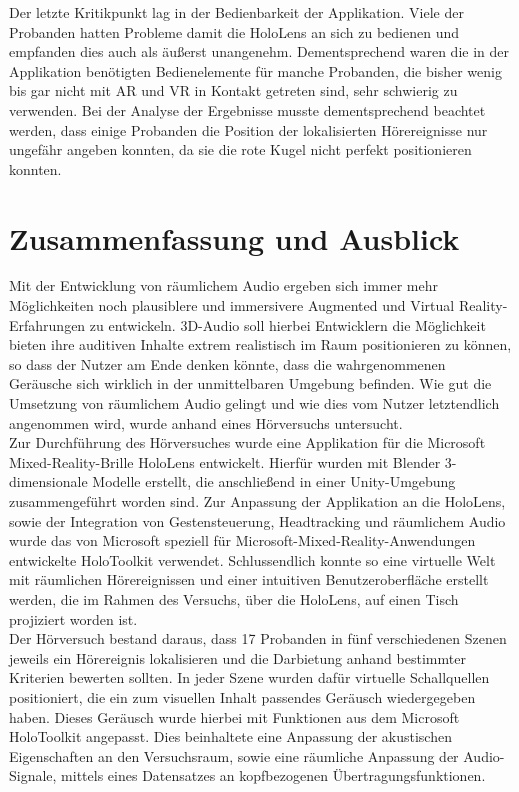 Der letzte Kritikpunkt lag in der Bedienbarkeit der Applikation. Viele der Probanden hatten Probleme damit die HoloLens an sich zu bedienen und empfanden dies auch als äußerst unangenehm. Dementsprechend waren die in der Applikation benötigten Bedienelemente für manche Probanden, die bisher wenig bis gar nicht mit AR und VR in Kontakt getreten sind, sehr schwierig zu verwenden. Bei der Analyse der Ergebnisse musste dementsprechend beachtet werden, dass einige Probanden die Position der lokalisierten Hörereignisse nur ungefähr angeben konnten, da sie die rote Kugel nicht perfekt positionieren konnten.


\chapter{Zusammenfassung und Ausblick}
Mit der Entwicklung von räumlichem Audio ergeben sich immer mehr Möglichkeiten noch plausiblere und immersivere Augmented und Virtual Reality-Erfahrungen zu entwickeln. 3D-Audio soll hierbei Entwicklern die Möglichkeit bieten ihre auditiven Inhalte extrem realistisch im Raum positionieren zu können, so dass der Nutzer am Ende denken könnte, dass die wahrgenommenen Geräusche sich wirklich in der unmittelbaren Umgebung befinden. Wie gut die Umsetzung von räumlichem Audio gelingt und wie dies vom Nutzer letztendlich angenommen wird, wurde anhand eines Hörversuchs untersucht. \\ 

Zur Durchführung des Hörversuches wurde eine Applikation für die Microsoft Mixed-Reality-Brille HoloLens entwickelt. Hierfür wurden mit Blender 3-dimensionale Modelle erstellt, die anschließend in einer Unity-Umgebung zusammengeführt worden sind. Zur Anpassung der Applikation an die HoloLens, sowie der Integration von Gestensteuerung, Headtracking und räumlichem Audio wurde das von Microsoft speziell für Microsoft-Mixed-Reality-Anwendungen entwickelte HoloToolkit verwendet. Schlussendlich konnte so eine virtuelle Welt mit räumlichen Hörereignissen und einer intuitiven Benutzeroberfläche erstellt werden, die im Rahmen des Versuchs, über die HoloLens, auf einen Tisch projiziert worden ist. \\

Der Hörversuch bestand daraus, dass 17 Probanden in fünf verschiedenen Szenen jeweils ein Hörereignis lokalisieren und die Darbietung anhand bestimmter Kriterien bewerten sollten. In jeder Szene wurden dafür virtuelle Schallquellen positioniert, die ein zum visuellen Inhalt passendes Geräusch wiedergegeben haben. Dieses Geräusch wurde hierbei mit Funktionen aus dem Microsoft HoloToolkit angepasst. Dies beinhaltete eine Anpassung der akustischen Eigenschaften an den Versuchsraum, sowie eine räumliche Anpassung der Audio-Signale, mittels eines Datensatzes an kopfbezogenen Übertragungsfunktionen. \\


